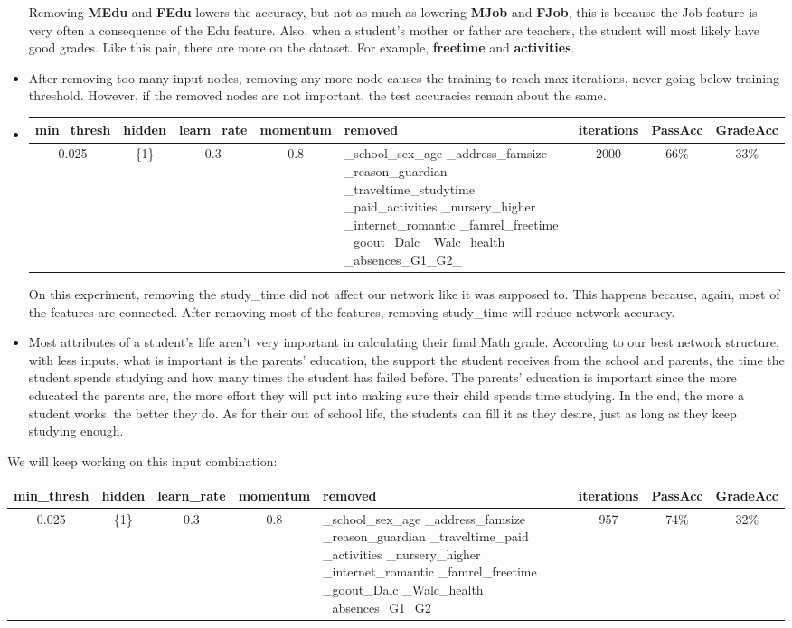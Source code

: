 \documentclass[11pt]{article}
\begin{document}
\begin{itemize}
Removing \textbf{MEdu} and \textbf{FEdu} lowers the accuracy, but not as much as lowering \textbf{MJob} and \textbf{FJob}, this is because the Job feature is very often a consequence of the Edu feature. Also, when a student's mother or father are teachers, the student will most likely have good grades. Like this pair, there are more on the dataset. For example, \textbf{freetime} and \textbf{activities}.
\item After removing too many input nodes, removing any more node causes the training to reach max iterations, never going below training threshold. However, if the removed nodes are not important, the test accuracies remain about the same.
\item \begin{tabular}{| c | c | c | c | p{3cm} | c | c | c |}
\hline \textbf{min\_thresh} & \textbf{hidden} & \textbf{learn\_rate} & \textbf{momentum} & \textbf{removed} & \textbf{iterations} & \textbf{PassAcc} & \textbf{GradeAcc}\\
\hline 0.025 & \{1\} & 0.3 & 0.8 & \_school\_sex\_age \_address\_famsize \_reason\_guardian \_traveltime\_studytime \_paid\_activities \_nursery\_higher \_internet\_romantic \_famrel\_freetime \_goout\_Dalc \_Walc\_health \_absences\_G1\_G2\_ & 2000 & 66\% & 33\%\\
\hline
\end{tabular}
On this experiment, removing the study\_time did not affect our network like it was supposed to. This happens because, again, most of the features are connected. After removing most of the features, removing study\_time will reduce network accuracy.
\item Most attributes of a student's life aren't very important in calculating their final Math grade. According to our best network structure, with less inputs, what is important is the parents' education, the support the student receives from the school and parents, the time the student spends studying and how many times the student has failed before. The parents' education is important since the more educated the parents are, the more effort they will put into making sure their child spends time studying. In the end, the more a student works, the better they do. As for their out of school life, the students can fill it as they desire, just as long as they keep studying enough.
\end{itemize}

We will keep working on this input combination:

\begin{tabular}{| c | c | c | c | p{3cm} | c | c | c |}
\hline \textbf{min\_thresh} & \textbf{hidden} & \textbf{learn\_rate} & \textbf{momentum} & \textbf{removed} & \textbf{iterations} & \textbf{PassAcc} & \textbf{GradeAcc}\\
\hline 0.025 & \{1\} & 0.3 & 0.8 & \_school\_sex\_age \_address\_famsize \_reason\_guardian \_traveltime\_paid \_activities \_nursery\_higher \_internet\_romantic \_famrel\_freetime \_goout\_Dalc \_Walc\_health \_absences\_G1\_G2\_ & 957 & 74\% & 32\%\\
\hline
\end{tabular}
\end{document}
